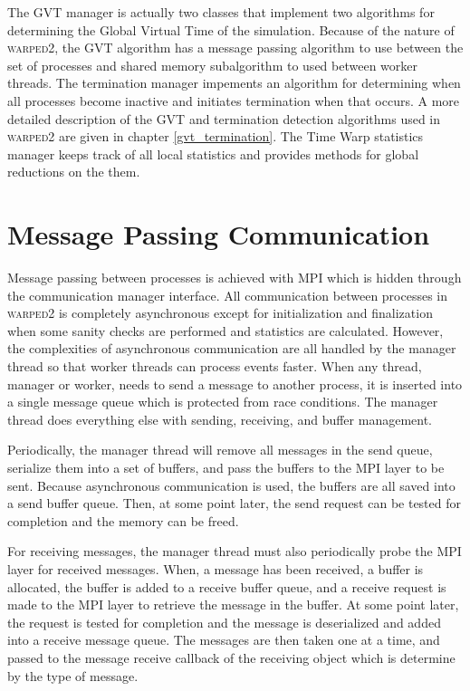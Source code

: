 \documentclass[11pt]{book}
\begin{document}
The GVT manager is actually two classes that implement two algorithms for determining the Global
Virtual Time of the simulation. Because of the nature of \textsc{warped2}, the GVT algorithm has
a message passing algorithm to use between the set of processes and shared memory subalgorithm
to used between worker threads. The termination manager impements an algorithm for determining
when all processes become inactive and initiates termination when that occurs. A more detailed
description of the GVT and termination detection algorithms used in \textsc{warped2} are given
in chapter \ref{gvt_termination}. The Time Warp statistics manager keeps track of all local
statistics and provides methods for global reductions on the them. 

\section{Message Passing Communication}

Message passing between processes is achieved with MPI which is hidden through the communication
manager interface.  All communication between processes in \textsc{warped2} is completely
asynchronous except for initialization and finalization when some sanity checks are performed
and statistics are calculated. However, the complexities of asynchronous communication are all
handled by the manager thread so that worker threads can process events faster. When any thread,
manager or worker, needs to send a message to another process, it is inserted into a single
message queue which is protected from race conditions. The manager thread does everything else
with sending, receiving, and buffer management.

Periodically, the manager thread will remove all messages in the send queue, serialize them
into a set of buffers, and pass the buffers to the MPI layer to be sent. Because asynchronous
communication is used, the buffers are all saved into a send buffer queue. Then, at some point
later, the send request can be tested for completion and the memory can be freed.

For receiving messages, the manager thread must also periodically probe the MPI layer for
received messages. When, a message has been received, a buffer is allocated, the buffer is added
to a receive buffer queue, and a receive request is made to the MPI layer to retrieve the message
in the buffer. At some point later, the request is tested for completion and the message is
deserialized and added into a receive message queue. The messages are then taken one at a time,
and passed to the message receive callback of the receiving object which is determine by the
type of message.
\end{document}
